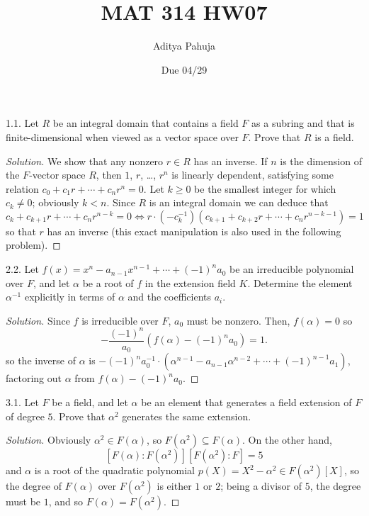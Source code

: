 \documentclass[10pt]{scrartcl}
\title{\vspace{-2em}MAT 314 HW07}
\author{\large Aditya Pahuja}
\date{\large Due 04/29}
\providecommand{\inv}{^{-1}}
\newenvironment{soln}{\begin{proof}[Solution]}{\end{proof}}
\begin{document}
\maketitle

\begin{problem*}1.1.
	Let $R$ be an integral domain that contains a field $F$
	as a subring and that is finite-dimensional when viewed as
	a vector space over $F$. Prove that $R$ is a field.
\end{problem*}

\begin{soln}
	We show that any nonzero $r\in R$ has an inverse.
	If $n$ is the dimension of the $F$-vector space $R$, then
	$1$, $r$, \dots, $r^n$ is linearly dependent, satisfying some relation
	$c_0 + c_1r + \cdots + c_nr^n = 0$. Let $k\ge 0$ be the smallest integer
	for which $c_k\ne 0$; obviously $k<n$. Since $R$ is an integral domain
	we can deduce that
	\[c_k + c_{k+1}r + \cdots + c_nr^{n-k} = 0
	\iff r\cdot (-c_k\inv)(c_{k+1} + c_{k+2}r + \cdots + c_n r^{n-k-1}) = 1\]
	so that $r$ has an inverse (this exact manipulation is also used
	in the following problem).
\end{soln}

\begin{problem*}2.2.
	Let $f(x) = x^n - a_{n-1}x^{n-1} + \cdots + (-1)^n a_0$ be
	an irreducible polynomial over $F$, and let $\alpha$ be a root of $f$
	in the extension field $K$. Determine the element $\alpha\inv$ explicitly
	in terms of $\alpha$ and the coefficients $a_i$.
\end{problem*}

\begin{soln}
	Since $f$ is irreducible over $F$, $a_0$ must be nonzero.
	Then, $f(\alpha)=0$ so
	\[-\frac{(-1)^n}{a_0}(f(\alpha) - (-1)^n a_0) = 1.\]
	so the inverse of $\alpha$ is $-(-1)^na_0\inv\cdot
	(\alpha^{n-1} - a_{n-1}\alpha^{n-2} + \cdots + (-1)^{n-1}a_1)$,
	factoring out $\alpha$ from $f(\alpha) - (-1)^na_0$.
\end{soln}

\begin{problem*}3.1.
	Let $F$ be a field, and let $\alpha$ be an element that generates
	a field extension of $F$ of degree $5$.
	Prove that $\alpha^2$ generates the same extension.
\end{problem*}

\begin{soln}
	Obviously $\alpha^2\in F(\alpha)$, so $F(\alpha^2)\subseteq F(\alpha)$.
	On the other hand,
	\[[F(\alpha):F(\alpha^2)][F(\alpha^2):F] = 5\]
	and $\alpha$ is a root of the quadratic polynomial
	$p(X) = X^2 - \alpha^2\in F(\alpha^2)[X]$, so the degree of $F(\alpha)$
	over $F(\alpha^2)$ is either $1$ or $2$; being a divisor of $5$,
	the degree must be $1$, and so $F(\alpha) = F(\alpha^2)$.
\end{soln}
\end{document}
